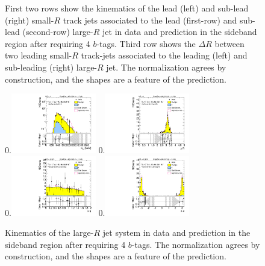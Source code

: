 \begin{figure}[htbp!]
\begin{center}
  \caption{First two rows show the kinematics of the lead (left) and sub-lead (right) small-$R$ track jets associated to the lead (first-row) and sub-lead (second-row) large-$R$ jet in data and prediction in the sideband region after requiring 4 $b$-tags. Third row shows the $\Delta R$ between two leading small-$R$ track-jets associated to the leading (left) and sub-leading (right) large-$R$ jet. The normalization agrees by construction, and the shapes are a feature of the prediction. }
  \label{fig:boosted-4b-control-ak2}
\end{center}
\end{figure}


\begin{figure}[htbp!]
\begin{center}
0.\includegraphics[width=0.33\textwidth, angle=270]{./figures/boosted/Control/Moriond_FourTag_Control_mHH_l_1.pdf}
0.\includegraphics[width=0.33\textwidth, angle=270]{./figures/boosted/Control/Moriond_FourTag_Control_hCandDr.pdf}\\
0.\includegraphics[width=0.33\textwidth, angle=270]{./figures/boosted/Control/Moriond_FourTag_Control_hCandDeta.pdf}
0.\includegraphics[width=0.33\textwidth, angle=270]{./figures/boosted/Control/Moriond_FourTag_Control_hCandDphi.pdf}
  \caption{Kinematics of the large-$R$ jet system in data and prediction in the sideband region after requiring 4 $b$-tags. The normalization agrees by construction, and the shapes are a feature of the prediction. }
  \label{fig:boosted-4b-control-ak10-system}
\end{center}
\end{figure}

